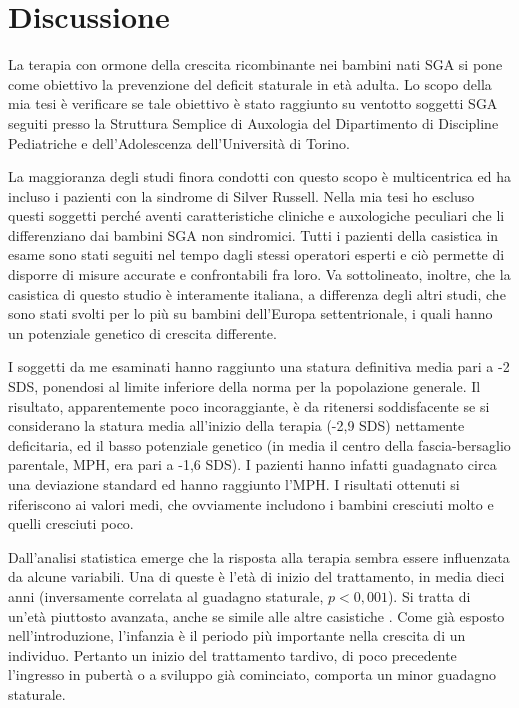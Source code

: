 \chapter{Discussione}

La terapia con ormone della crescita ricombinante nei bambini nati SGA si pone come obiettivo la prevenzione del deficit staturale in età adulta.
Lo scopo della mia tesi è verificare se tale obiettivo è stato raggiunto su ventotto soggetti SGA seguiti presso la Struttura Semplice di Auxologia del Dipartimento di Discipline Pediatriche e dell'Adolescenza dell'Università  di Torino.

La maggioranza  degli studi finora condotti con questo scopo è multicentrica ed ha incluso i pazienti con la  sindrome di Silver Russell. Nella mia tesi ho escluso questi soggetti perché aventi caratteristiche cliniche e auxologiche peculiari che li differenziano dai bambini SGA non sindromici. Tutti i pazienti della casistica in esame sono stati seguiti nel tempo dagli stessi operatori esperti e ciò permette di disporre di misure accurate e confrontabili fra loro. Va sottolineato, inoltre, che la casistica di questo studio è interamente italiana, a differenza degli altri studi, che sono stati svolti per lo più su bambini dell'Europa settentrionale, i quali hanno un potenziale genetico di crescita differente.

I soggetti da me esaminati hanno raggiunto una statura definitiva media pari a -2 SDS, ponendosi al limite inferiore della norma per la popolazione generale. Il risultato, apparentemente poco incoraggiante, è da ritenersi soddisfacente se si considerano la statura  media all'inizio della terapia (-2,9 SDS) nettamente deficitaria, ed il basso potenziale genetico (in media il centro della fascia-bersaglio parentale, MPH, era pari a -1,6 SDS). I pazienti hanno infatti guadagnato circa una deviazione standard ed hanno raggiunto l'MPH. I risultati ottenuti si riferiscono ai valori medi, che ovviamente includono i bambini cresciuti molto e quelli cresciuti poco. 

Dall'analisi statistica emerge che la risposta alla terapia sembra essere influenzata da alcune variabili.
Una di queste è l'età di inizio del trattamento, in media dieci anni (inversamente correlata al guadagno staturale, $p < 0,001$). Si tratta di un'età piuttosto avanzata, anche se simile alle altre casistiche\cite{coutant1998short} \cite{zucchini2001final}. Come già esposto nell'introduzione, l'infanzia è il periodo più importante nella crescita di un individuo. Pertanto un inizio del trattamento tardivo, di poco precedente l'ingresso in pubertà o a sviluppo già cominciato, comporta un minor guadagno staturale. 


